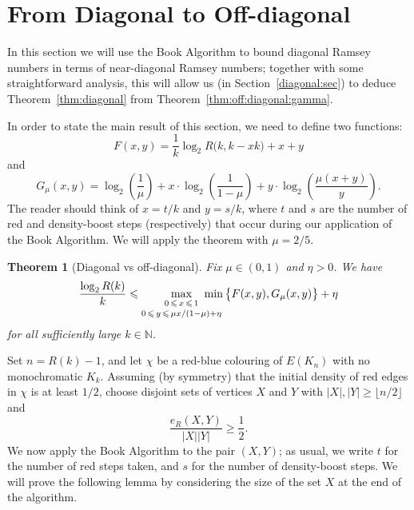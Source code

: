 \documentclass[12pt,reqno]{amsart}
\newtheorem{theorem}{Theorem}[section]
\theoremstyle{definition}
\theoremstyle{remark}
\newcommand\N{\mathbb{N}}
\renewcommand{\le}{\leqslant}
\renewcommand{\ge}{\geqslant}
\def\N{\mathbb{N}}
\begin{document}

\section{From Diagonal to Off-diagonal}\label{moving:sec}

In this section we will use the Book Algorithm to bound diagonal Ramsey numbers in terms of near-diagonal Ramsey numbers; together with some straightforward analysis, this will allow us (in Section~\ref{diagonal:sec}) to deduce Theorem~\ref{thm:diagonal} from Theorem~\ref{thm:off:diagonal:gamma}. 
 
In order to state the main result of this section, %
we need to define two functions:
\begin{equation}\label{def:F}
F(x,y) = \frac{1}{k}\log_2 R\big( k, k - xk \big) + x + y
\end{equation}
and 
\begin{equation}\label{def:G}
G_\mu(x,y) = \log_2 \left( \frac{1}{\mu} \right) + x \cdot \log_2 \left(\frac{1}{1 - \mu} \right) + y \cdot \log_2 \left(\frac{\mu(x+y)}{y}\right).
\end{equation} 
The reader should think of $x = t/k$ and $y = s/k$, where $t$ and $s$ are  the number of red and density-boost steps (respectively) that occur during our application of the Book Algorithm. %
We will apply the theorem with $\mu = 2/5$. 

\pagebreak

\begin{theorem}[Diagonal vs off-diagonal]\label{thm:moving}
Fix\/ $\mu \in (0,1)$ and\/ $\eta > 0$. We have 
\begin{equation}\label{eq:diag:vs:offdiag}
\frac{\log_2 R(k)}{k} \le \max_{\substack{\\[-0.05ex] 0 \,\le\, x \,\le\, 1 \\[+0.3ex] 0 \,\le\, y \,\le\, \mu x/(1-\mu)+\eta}} \hspace{-0.6cm} \min \big\{ F(x,y),G_\mu(x,y) \big\} + \eta
\end{equation}
for all sufficiently large $k \in \N$. 
\end{theorem}

Set $n = R(k)-1$, and let $\chi$ be a red-blue colouring of $E(K_n)$ with no monochromatic $K_k$. Assuming (by symmetry) that the initial density of red edges in $\chi$ is at least $1/2$, choose disjoint sets of vertices $X$ and $Y$ with $|X|,|Y| \ge \lfloor n/2 \rfloor$ and 
$$\frac{e_R(X,Y)}{|X||Y|} \ge \frac{1}{2}.$$
We now apply the Book Algorithm to the pair $(X,Y)$; as usual, we write $t$ for the number of red steps taken, and $s$ for the number of density-boost steps. We will prove the following lemma by considering the size of the set $X$ at the end of the algorithm. 
\end{document}
